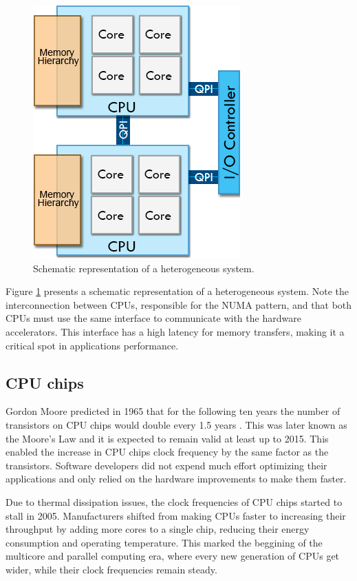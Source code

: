 \begin{figure}[!htp]
	\begin{center}
		\includegraphics[scale=0.5]{../../common/img/numa_qpi.png}
		\caption{Schematic representation of a heterogeneous system.}
		\label{fig:HeterogeneousSystem}
	\end{center}
\end{figure}

Figure \ref{fig:HeterogeneousSystem} presents a schematic representation of a heterogeneous system. Note the interconnection between CPUs, responsible for the NUMA pattern, and that both CPUs must use the same interface to communicate with the hardware accelerators. This interface has a high latency for memory transfers, making it a critical spot in applications performance.

\subsection*{CPU chips}
\label{CPUChips}

Gordon Moore predicted in 1965 that for the following ten years the number of transistors on CPU chips would double every 1.5 years \cite{MooreLaw}. This was later known as the Moore's Law and it is expected to remain valid at least up to 2015. This enabled the increase in CPU chips clock frequency by the same factor as the transistors. Software developers did not expend much effort optimizing their applications and only relied on the hardware improvements to make them faster.

Due to thermal dissipation issues, the clock frequencies of CPU chips started to stall in 2005. Manufacturers shifted from making CPUs faster to increasing their throughput by adding more cores to a single chip, reducing their energy consumption and operating temperature. This marked the beggining of the multicore and parallel computing era, where every new generation of CPUs get wider, while their clock frequencies remain steady.

